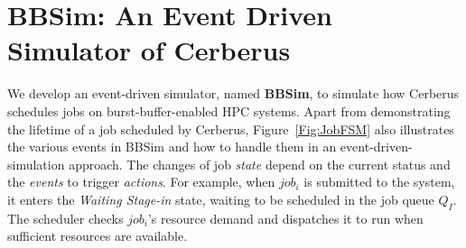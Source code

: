 

\section{BBSim: An Event Driven Simulator of Cerberus}
\label{Sec:Simulation}

We develop an event-driven simulator, named \textbf{BBSim},
to simulate how Cerberus schedules jobs on burst-buffer-enabled HPC systems.
Apart from demonstrating the lifetime of a job scheduled by Cerberus,
Figure~\ref{Fig:JobFSM} also illustrates the various events in BBSim and how to handle
them in an event-driven-simulation approach.
The changes of job \textit{state} depend on the current status and the \textit{events} to trigger \textit{actions}.
For example, when $job_i$ is submitted to the system,
it enters the \textit{Waiting Stage-in} state,
waiting to be scheduled in the job queue $Q_I$. 
The scheduler checks $job_i$'s resource demand and
dispatches it to run when sufficient resources are available.

